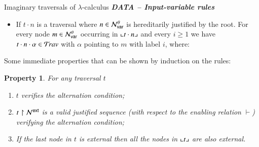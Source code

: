 \documentclass{elsarticle}
\theoremstyle{plain}
\newtheorem{property}[theorem]{Property}
\theoremstyle{definition}
\theoremstyle{remark}
\newcommand\Nodes{\mathcal{N}}%
\newcommand\NodesVar{\Nodes_{\sf var}}%
\newcommand{\ghostlmd}{{\lambda\!\!\lambda}}
\newcommand{\ghostvar}{\theta}
\newcommand\ImNodesVar{\NodesVar^\ghostvar}
\newcommand{\travulc}{\travset}
\newcommand{\enables}{\vdash} %
\newcommand{\ExtNodes}{\Nodes^{\sf ext}}
\begin{document}
\begin{table}
\begin{ruletablebox}{Imaginary traversals of $\lambda$-calculus}
\emph{\bf DATA -- Input-variable rules}
\begin{itemize}[leftmargin=3em]
\item[\rulenamet{IVar}] If $t \cdot n$ is a traversal where $n \in \ImNodesVar$ is hereditarily justified by the root. For every node $m \in \ImNodesVar$ occurring in $\llcorner t\cdot n \lrcorner$
and every $i\geq1$ we have $t \cdot n \cdot\alpha\in\travulc$ with $\alpha$ pointing to $m$ with label $i$, where:
\end{itemize}


\caption{Imaginary traversals $\travulc$ of the untyped lambda calculus.}
 \label{tab:trav_rules}
\end{ruletablebox}
\end{table}

Some immediate properties that can be shown by induction on the rules:
\begin{property}
    \label{prop:trav_immediate}
   For any traversal $t$
   \begin{enumerate}[nosep]
   \item $t$ verifies the alternation condition;
   \item $t\filter\ExtNodes$ is a valid justified sequence (with respect to the enabling relation $\enables$) verifying the alternation condition;
   \item If the last node in $t$ is external then all the nodes in $\llcorner t \lrcorner$ are also external.
   \end{enumerate}
\end{property}
\end{document}
